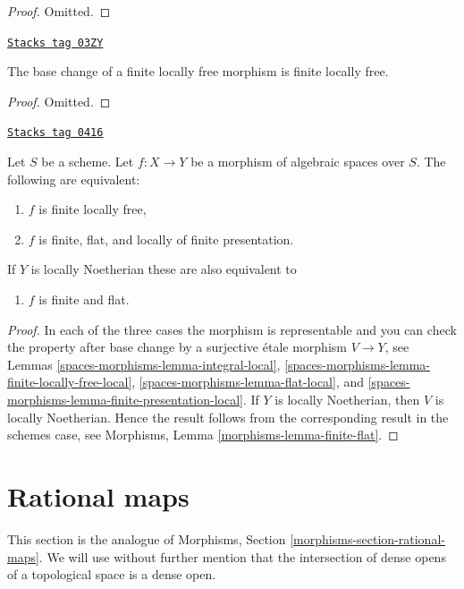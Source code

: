 \begin{proof}
Omitted.
\end{proof}

\begin{lemma}
\label{spaces-morphisms-lemma-base-change-finite-locally-free}
\href{https://stacks.math.columbia.edu/tag/03ZY}{\texttt{Stacks tag 03ZY}}

The base change of a finite locally free morphism is finite locally free.
\end{lemma}

\begin{proof}
Omitted.
\end{proof}

\begin{lemma}
\label{spaces-morphisms-lemma-finite-flat}
\href{https://stacks.math.columbia.edu/tag/0416}{\texttt{Stacks tag 0416}}

Let $S$ be a scheme.
Let $f : X \to Y$ be a morphism of algebraic spaces over $S$.
The following are equivalent:
\begin{enumerate}
\item $f$ is finite locally free,
\item $f$ is finite, flat, and locally of finite presentation.
\end{enumerate}
If $Y$ is locally Noetherian these are also equivalent to
\begin{enumerate}
\item[(3)] $f$ is finite and flat.
\end{enumerate}
\end{lemma}

\begin{proof}
In each of the three cases the morphism is representable and you
can check the property after base change by a surjective \'etale morphism
$V \to Y$, see
Lemmas \ref{spaces-morphisms-lemma-integral-local},
\ref{spaces-morphisms-lemma-finite-locally-free-local},
\ref{spaces-morphisms-lemma-flat-local}, and
\ref{spaces-morphisms-lemma-finite-presentation-local}.
If $Y$ is locally Noetherian, then $V$ is locally Noetherian.
Hence the result follows from the corresponding result
in the schemes case, see
Morphisms, Lemma \ref{morphisms-lemma-finite-flat}.
\end{proof}

\section{Rational maps}
\label{spaces-morphisms-section-rational-maps}
This section is the analogue of
Morphisms, Section \ref{morphisms-section-rational-maps}.
We will use without further mention that the intersection of dense opens
of a topological space is a dense open.

